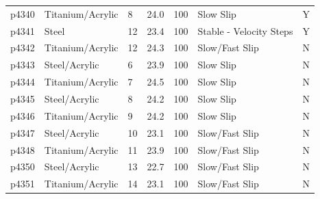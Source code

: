\documentclass[11pt]{article}
\begin{document}
\begin{center}
\begin{tabular}{ | l l p{1.6cm} p{1.7cm} p{1.6cm} p{4cm} p{0.5cm} | }
p4340	     & Titanium/Acrylic & 8                   & 24.0            & 100                   & Slow Slip                       & Y              \\
p4341	     & Steel            & 12                  & 23.4            & 100                   & Stable - Velocity Steps         & Y              \\
p4342	     & Titanium/Acrylic & 12                  & 24.3            & 100                   & Slow/Fast Slip                  & N              \\
p4343	     & Steel/Acrylic    & 6                   & 23.9            & 100                   & Slow Slip                       & N              \\
p4344	     & Titanium/Acrylic & 7                   & 24.5            & 100                   & Slow Slip                       & N              \\
p4345	     & Steel/Acrylic    & 8                   & 24.2            & 100                   & Slow Slip                       & N              \\
p4346	     & Titanium/Acrylic & 9                   & 24.2            & 100                   & Slow Slip                       & N              \\
p4347	     & Steel/Acrylic    & 10                  & 23.1            & 100                   & Slow/Fast Slip                  & N              \\
p4348	     & Titanium/Acrylic & 11                  & 23.9            & 100                   & Slow/Fast Slip                  & N              \\
p4350	     & Steel/Acrylic    & 13                  & 22.7            & 100                   & Slow/Fast Slip                  & N              \\
p4351	     & Titanium/Acrylic & 14                  & 23.1            & 100                   & Slow/Fast Slip                  & N              \\


    \hline
    \end{tabular}
\end{center}
\end{document}
